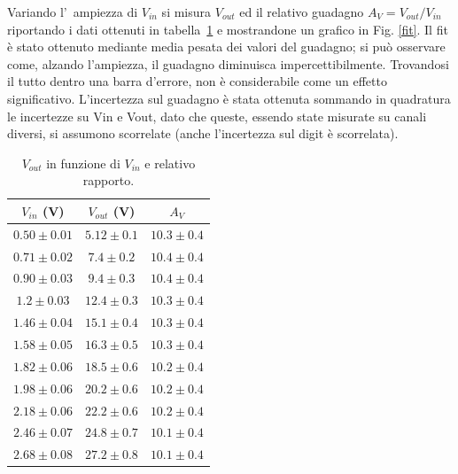 \documentclass[10pt,a4paper]{article}
\begin{document}
	Variando l'~ampiezza di $V_{in}$ si misura $V_{out}$ ed il relativo guadagno $A_V=V_{out}/V_{in}$ riportando i dati ottenuti in tabella~\ref{tab:guadagno} 
	e mostrandone un grafico in Fig. \ref{fit}. 
	Il fit è stato ottenuto mediante media pesata dei valori del guadagno; si può osservare come, alzando l'ampiezza, il guadagno diminuisca impercettibilmente. Trovandosi il tutto dentro una barra d'errore, non è considerabile come un effetto significativo.
	L'incertezza sul guadagno è stata ottenuta sommando in quadratura le incertezze su Vin e Vout, dato che queste, essendo state misurate su canali diversi, si assumono scorrelate (anche l'incertezza sul digit è scorrelata).
	
	\begin{table}[h]
		\caption{$V_{out}$ in funzione di $V_{in}$ e relativo rapporto.}
		\label{tab:guadagno}
		\begin{center}
			\begin{tabular}{|c|c|c|}
				\hline
				$V_{in}$ (V) & $V_{out}$ (V)  & $A_V$ \\
				\hline
				\hline
				$ 0.50\pm 0.01 $ & $5.12 \pm 0.1 $ & $10.3 \pm 0.4 $ \\
				\hline
				$0.71 \pm 0.02 $ & $7.4 \pm 0.2 $ & $10.4 \pm 0.4 $ \\
				\hline
				$0.90 \pm 0.03 $ & $9.4 \pm 0.3 $ & $10.4 \pm 0.4 $ \\
				\hline
				$1.2 \pm 0.03 $ & $12.4 \pm 0.3 $ & $10.3 \pm 0.4 $ \\
				\hline
				$1.46 \pm 0.04 $ & $15.1 \pm 0.4 $ & $10.3 \pm 0.4 $ \\
				\hline
				$1.58 \pm 0.05 $ & $16.3 \pm 0.5 $ & $10.3 \pm 0.4 $ \\
				\hline
				$1.82 \pm 0.06 $ & $18.5 \pm 0.6 $ & $10.2 \pm 0.4 $ \\
				\hline
				$1.98 \pm 0.06 $ & $20.2 \pm 0.6 $ & $10.2 \pm 0.4 $ \\
				\hline
				$2.18 \pm 0.06 $ & $22.2 \pm 0.6 $ & $10.2 \pm 0.4 $ \\
				\hline
				$2.46 \pm 0.07 $ & $24.8 \pm 0.7 $ & $10.1 \pm 0.4 $ \\
				\hline
				$2.68 \pm 0.08 $ & $27.2 \pm 0.8 $ & $10.1 \pm 0.4 $ \\
				\hline
		
			\end{tabular}
		\end{center}
	\end{table}
\end{document}
